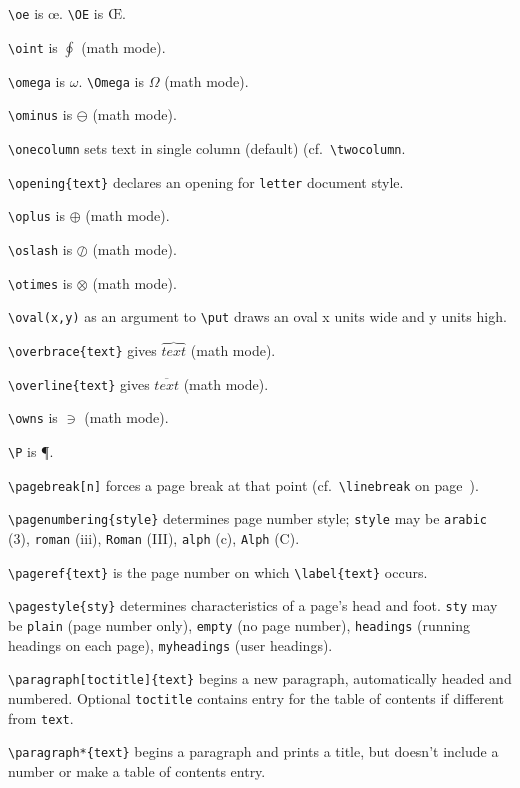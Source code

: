 \verb"\oe" is \oe.  \verb"\OE" is \OE.

\verb"\oint" is $\oint$ (math mode).

\verb"\omega" is $\omega$.  \verb"\Omega" is $\Omega$ (math mode).

\verb"\ominus" is $\ominus$ (math mode).

\verb"\onecolumn" sets text in single column (default) (cf.\ \verb"\twocolumn".

\verb"\opening{text}" declares an opening for \verb"letter" document style.

\verb"\oplus" is $\oplus$ (math mode).

\verb"\oslash" is $\oslash$ (math mode).

\verb"\otimes" is $\otimes$ (math mode).

\verb"\oval(x,y)" as an argument to \verb"\put" draws an oval x units
	wide and y units high.

\verb"\overbrace{text}" gives $\overbrace{text}$ (math mode).

\verb"\overline{text}" gives $\overline{text}$ (math mode).

\verb"\owns" is $\owns$ (math mode).

\verb"\P" is \P.

\verb"\pagebreak[n]" forces a page break at that point
	(cf.\ \verb"\linebreak" on page~\pageref{break-ref}).

\verb"\pagenumbering{style}" determines page number style; \verb"style" may be
	\verb"arabic" (3), \verb"roman" (iii), \verb"Roman" (III),
	\verb"alph" (c), \verb"Alph" (C).

\verb"\pageref{text}" is the page number on which \verb"\label{text}" occurs.

\verb"\pagestyle{sty}" determines characteristics of a page's
	head and foot.  \verb"sty" may be \verb"plain" (page number only),
	\verb"empty" (no page number), \verb"headings" (running headings
	on each page), \verb"myheadings" (user headings).

\verb"\paragraph[toctitle]{text}" begins a new paragraph, automatically headed and
	numbered.  Optional \verb"toctitle" contains entry for the
	table of contents if different from \verb"text".

\verb"\paragraph*{text}" begins a paragraph and prints a title, but doesn't include
	a number or make a table of contents entry.

